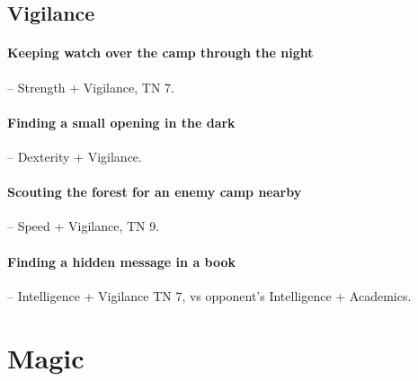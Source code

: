 \begin{multicols}{2}
\subsection{Vigilance}

\paragraph{Keeping watch over the camp through the night} -- Strength + Vigilance, TN 7.

\paragraph{Finding a small opening in the dark} -- Dexterity + Vigilance.

\paragraph{Scouting the forest for an enemy camp nearby} -- Speed + Vigilance, TN 9.

\paragraph{Finding a hidden message in a book} -- Intelligence + Vigilance TN 7, vs opponent's Intelligence + Academics.

\end{multicols}

\section{Magic}

